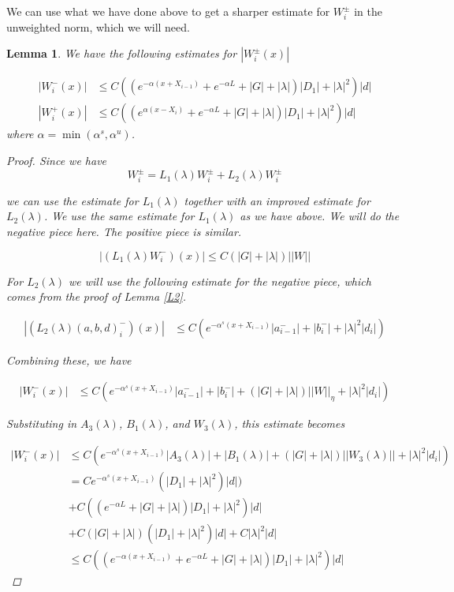 \documentclass[12pt]{article}
\newtheorem{lemma}{Lemma}
\begin{document}
We can use what we have done above to get a sharper estimate for $W_i^\pm$ in the unweighted norm, which we will need.

\begin{lemma}
We have the following estimates for $|W_i^\pm(x)|$

\begin{align*}
| W_i^-(x)| &\leq C ( (e^{-\alpha(x + X_{i-1})} + e^{-\alpha L} + |G| + |\lambda|)|D_1| + |\lambda|^2 )|d|\\
| W_i^+(x)| &\leq C ( (e^{\alpha(x - X_{i})} + e^{-\alpha L} + |G| + |\lambda|)|D_1| + |\lambda|^2 )|d|
\end{align*}
where $\alpha = \min(\alpha^s, \alpha^u)$.

\begin{proof}
Since we have 
\[
W_i^\pm = L_1(\lambda)W_i^\pm + L_2(\lambda)W_i^\pm 
\]

we can use the estimate for $L_1(\lambda)$ together with an improved estimate for $L_2(\lambda)$. We use the same estimate for $L_1(\lambda)$ as we have above. We will do the negative piece here. The positive piece is similar.

\[
| (L_1(\lambda) W_i^-)(x) | \leq C\left(|G| +|\lambda|\right)||W||
\]

For $L_2(\lambda)$ we will use the following estimate for the negative piece, which comes from the proof of Lemma \ref{L2}.

\begin{align*}
| (L_2(\lambda)(a, b, d)_i^-)(x)| &\leq C \left( e^{-\alpha^s(x + X_{i-1})} |a^-_{i-1}| + |b_i^-| + |\lambda|^2 |d_i| \right)
\end{align*}

Combining these, we have

\begin{align*}
| W_i^-(x)| &\leq C \left( e^{-\alpha^s(x + X_{i-1})} |a^-_{i-1}| + |b_i^-| + \left(|G| +|\lambda|\right)||W||_\eta + |\lambda|^2 |d_i|  \right)
\end{align*}

Substituting in $A_3(\lambda)$, $B_1(\lambda)$, and $W_3(\lambda)$, this estimate becomes

\begin{align*}
| W_i^-(x)| &\leq C \left( e^{-\alpha^s(x + X_{i-1})} |A_3(\lambda)| + |B_1(\lambda)| + \left(|G| +|\lambda|\right)||W_3(\lambda)|| + |\lambda|^2 |d_i|  \right) \\
&= C e^{-\alpha^s(x + X_{i-1})} (|D_1| + |\lambda|^2)|d|)\\
&+ C ((e^{-\alpha L} + |G| + |\lambda|)|D_1| + |\lambda|^2)|d|\\
&+ C (|G| +|\lambda|)(|D_1| + |\lambda|^2)|d| + C |\lambda|^2|d| \\
&\leq C ( (e^{-\alpha(x + X_{i-1})} + e^{-\alpha L} + |G| + |\lambda|)|D_1| + |\lambda|^2 )|d|
\end{align*}


\end{proof}
\end{lemma}
\end{document}
